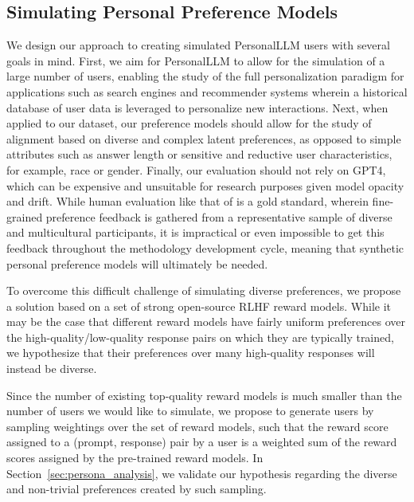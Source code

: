 \subsection{Simulating Personal Preference Models}\label{sec:sim_users}

We design our approach to creating simulated \textsf{PersonalLLM} users with several goals in mind.
First, we aim for \textsf{PersonalLLM} to allow for the simulation of a large number of users, enabling the study of the full personalization paradigm for applications such as search engines and recommender systems \citep{davidson2010youtube, das2007google, Xu_2022, F_rber_2020} wherein a historical database of user data is leveraged to personalize new interactions.
Next, when applied to our dataset, our preference models should allow for the study of alignment based on diverse and complex latent preferences, as opposed to simple attributes such as answer length or sensitive and reductive user characteristics, for example, race or gender.
Finally, our evaluation should not rely on GPT4, which can be expensive and unsuitable for research purposes given model opacity and drift.
While human evaluation like that of \citet{kirk2024prismalignmentprojectparticipatory} is a gold standard, wherein 
fine-grained preference feedback is gathered from a representative sample of diverse and multicultural participants, it is impractical or even impossible to get this feedback throughout the methodology development cycle, meaning that synthetic personal preference models will ultimately be needed.

To overcome this difficult challenge of simulating diverse preferences, we propose a solution based on a set of strong open-source RLHF reward models.  
While it may be the case that different reward models have fairly uniform preferences over the high-quality/low-quality response pairs on which they are typically trained, we hypothesize that their preferences over many high-quality responses will instead be diverse.

Since the number of existing top-quality reward models is much smaller than the number of users we would like to simulate, we propose to generate users by sampling weightings over the set of reward models, such that the reward score assigned to a (prompt, response) pair by a user is a weighted sum of the reward scores assigned by the pre-trained reward models.
In Section~\ref{sec:persona_analysis}, we validate our hypothesis regarding the diverse and non-trivial preferences created by such sampling.

